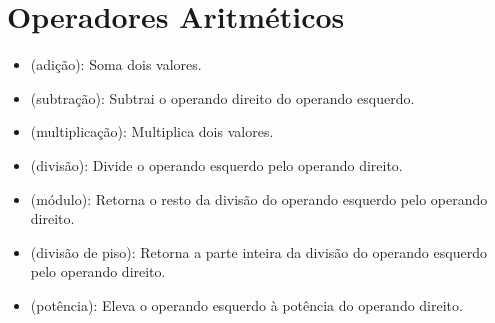 \documentclass[letterpaper,10pt,english]{jupyterBook}
\begin{document}
\section{Operadores Aritméticos}
\label{\detokenize{chapters/ch3/ch3:operadores-aritmeticos}}\begin{itemize}
\item {} 
\sphinxAtStartPar
\sphinxcode{\sphinxupquote{+}} (adição): Soma dois valores.

\item {} 
\sphinxAtStartPar
\sphinxcode{\sphinxupquote{\sphinxhyphen{}}} (subtração): Subtrai o operando direito do operando esquerdo.

\item {} 
\sphinxAtStartPar
\sphinxcode{\sphinxupquote{*}} (multiplicação): Multiplica dois valores.

\item {} 
\sphinxAtStartPar
\sphinxcode{\sphinxupquote{/}} (divisão): Divide o operando esquerdo pelo operando direito.

\item {} 
\sphinxAtStartPar
\sphinxcode{\sphinxupquote{\%}} (módulo): Retorna o resto da divisão do operando esquerdo pelo operando direito.

\item {} 
\sphinxAtStartPar
\sphinxcode{\sphinxupquote{//}} (divisão de piso): Retorna a parte inteira da divisão do operando esquerdo pelo operando direito.

\item {} 
\sphinxAtStartPar
\sphinxcode{\sphinxupquote{**}} (potência): Eleva o operando esquerdo à potência do operando direito.

\end{itemize}
\end{document}
